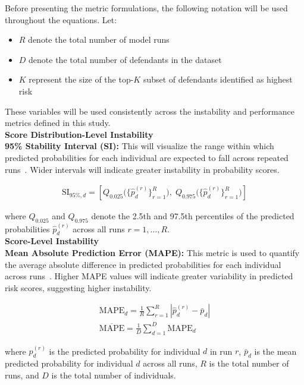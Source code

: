 \documentclass[12pt]{article}
\begin{document}
Before presenting the metric formulations, the following notation will be used throughout the equations. Let: 
\begin{itemize}
  \item \( R \) denote the total number of model runs
  \item \( D \) denote the total number of defendants in the dataset
  \item \( K \) represent the size of the top-\(K\) subset of defendants identified as highest risk
\end{itemize}
These variables will be used consistently across the instability and performance metrics defined in this study.\\

\textbf{Score Distribution-Level Instability} \\
\tab \textbf{95\% Stability Interval (SI):} This will visualize the range within which predicted probabilities for each individual are expected to fall across repeated runs~\cite{riley2023stability}. Wider intervals will indicate greater instability in probability scores.

\begin{align}
  \text{SI}_{95\%,d} =
  \left[
  Q_{0.025}\big(\{\hat{p}_d^{(r)}\}_{r=1}^{R}\big),
  \;
  Q_{0.975}\big(\{\hat{p}_d^{(r)}\}_{r=1}^{R}\big)
  \right]
\end{align}  

where \( Q_{0.025} \) and \( Q_{0.975} \) denote the 2.5th and 97.5th percentiles of the predicted probabilities \( \hat{p}_d^{(r)} \) across all runs \( r = 1, \dots, R \).\\

\textbf{Score-Level Instability} \\
\tab \textbf{Mean Absolute Prediction Error (MAPE):} This metric is used to quantify the average absolute difference in predicted probabilities for each individual across runs~\cite{riley2023stability}. Higher MAPE values will indicate greater variability in predicted risk scores, suggesting higher instability.

\begin{align}
  \text{MAPE}_d=\frac{1}{R}\sum_{r=1}^{R}|\hat{p}_{d}^{(r)}-\bar{p}_d| \\
  \overline{\text{MAPE}}=\frac{1}{D}\sum_{d=1}^{D}\text{MAPE}_d
\end{align} 

where \( \hat{p}_d^{(r)} \) is the predicted probability for individual \( d \) in run \( r \), \( \bar{p}_d \) is the mean predicted probability for individual \( d \) across all runs, \( R \) is the total number of runs, and \( D \) is the total number of individuals.\\
\end{document}
